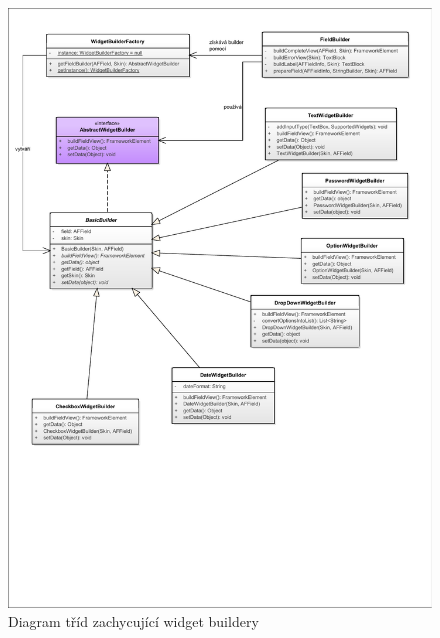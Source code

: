 \begin{figure}
\begin{center}
\includegraphics[width=\textwidth, height=\textheight]{figures/factoryWidgetBuilders}
\caption{Diagram tříd zachycující widget buildery}
\label{img:factoryWidgetBuilders}
\end{center}
\end{figure}


